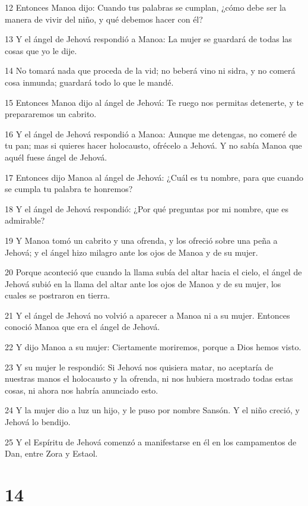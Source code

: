\par 12 Entonces Manoa dijo: Cuando tus palabras se cumplan, ¿cómo debe ser la manera de vivir del niño, y qué debemos hacer con él?
\par 13 Y el ángel de Jehová respondió a Manoa: La mujer se guardará de todas las cosas que yo le dije.
\par 14 No tomará nada que proceda de la vid; no beberá vino ni sidra, y no comerá cosa inmunda; guardará todo lo que le mandé.
\par 15 Entonces Manoa dijo al ángel de Jehová: Te ruego nos permitas detenerte, y te prepararemos un cabrito.
\par 16 Y el ángel de Jehová respondió a Manoa: Aunque me detengas, no comeré de tu pan; mas si quieres hacer holocausto, ofrécelo a Jehová. Y no sabía Manoa que aquél fuese ángel de Jehová.
\par 17 Entonces dijo Manoa al ángel de Jehová: ¿Cuál es tu nombre, para que cuando se cumpla tu palabra te honremos?
\par 18 Y el ángel de Jehová respondió: ¿Por qué preguntas por mi nombre, que es admirable?
\par 19 Y Manoa tomó un cabrito y una ofrenda, y los ofreció sobre una peña a Jehová; y el ángel hizo milagro ante los ojos de Manoa y de su mujer.
\par 20 Porque aconteció que cuando la llama subía del altar hacia el cielo, el ángel de Jehová subió en la llama del altar ante los ojos de Manoa y de su mujer, los cuales se postraron en tierra.
\par 21 Y el ángel de Jehová no volvió a aparecer a Manoa ni a su mujer. Entonces conoció Manoa que era el ángel de Jehová.
\par 22 Y dijo Manoa a su mujer: Ciertamente moriremos, porque a Dios hemos visto.
\par 23 Y su mujer le respondió: Si Jehová nos quisiera matar, no aceptaría de nuestras manos el holocausto y la ofrenda, ni nos hubiera mostrado todas estas cosas, ni ahora nos habría anunciado esto.
\par 24 Y la mujer dio a luz un hijo, y le puso por nombre Sansón. Y el niño creció, y Jehová lo bendijo.
\par 25 Y el Espíritu de Jehová comenzó a manifestarse en él en los campamentos de Dan, entre Zora y Estaol.

\chapter{14}

